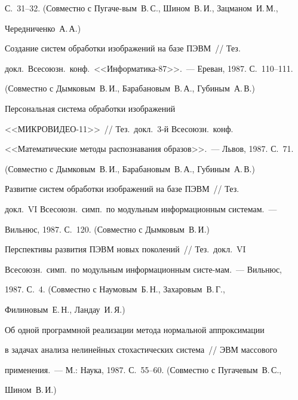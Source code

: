 С.~31--32. (Совместно с Пугаче-\linebreak вым~В.\,С., Шином~В.\,И., Зацманом~И.\,М.,


Чередниченко~А.\,А.)





 Создание систем обработки изображений на базе ПЭВМ~// Тез.\


докл.\ Всесоюзн.\ конф.\ <<Информатика-87>>.~--- Ереван, 1987. С.~110--111.


(Совместно с Дымковым~В.\,И., Барабановым~В.\,А., Губиным~А.\,В.)





 Персональная система обработки изображений


 <<МИК\-РО\-ВИ\-ДЕО-11>>~// Тез.\ докл.\ 3-й Всесоюзн.\ конф.\


<<Математические методы распознавания образов>>.~--- Львов, 1987. С.~71.


(Совместно с Дымковым~В.\,И., Барабановым~В.\,А., Губиным~А.\,В.)





 Развитие систем обработки изображений на базе ПЭВМ~// Тез.\


докл.\ VI Всесоюзн.\ симп.\ по модульным информационным системам.~---


Вильнюс, 1987. С.~120. (Совместно с Дымковым~В.\,И.)





 Перспективы развития ПЭВМ новых поколений~// Тез.\ докл.\ VI


Всесоюзн.\ симп.\ по модульным информационным систе-\linebreak мам.~--- Вильнюс,


1987. С.~4. (Совместно с Наумовым~Б.\,Н., Захаровым~В.\,Г.,


Филиновым~Е.\,Н., Ландау~И.\,Я.)





 Об одной программной реализации метода нормальной аппроксимации


в задачах анализа нелинейных стохастических система~// ЭВМ массового


применения.~--- М.: Наука, 1987. С.~55--60. (Совместно с Пугачевым~В.\,С.,


Шином~В.\,И.)





